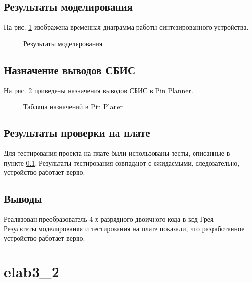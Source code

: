 \subsection{Результаты моделирования}
\label{sec:elab3_1_modeling}

На рис. \ref{fig:elab3_1_modeling} изображена временная диаграмма работы синтезированного устройства.

\begin{figure}[H]
\begin{center}
	\caption{Результаты моделирования}
	\label{fig:elab3_1_modeling}
\end{center}
\end{figure}

\subsection{Назначение выводов СБИС}

На рис. \ref{fig:elab3_1_pins} приведены назначения выводов СБИС в Pin Planner.

\begin{figure}[H]
\begin{center}
	\caption{Таблица назначений в Pin Planer}
	\label{fig:elab3_1_pins}
\end{center}
\end{figure}

\subsection{Результаты проверки на плате}

Для тестирования проекта на плате были использованы тесты, описанные в пункте \ref{sec:elab3_1_modeling}. Результаты тестирования совпадают с ожидаемыми, следовательно, устройство работает верно.

\subsection{Выводы}

Реализован преобразователь 4-х разрядного двоичного кода в код Грея. Результаты моделирования и тестирования на плате показали, что разработанное устройство работает верно.

\section{elab3\_2}

